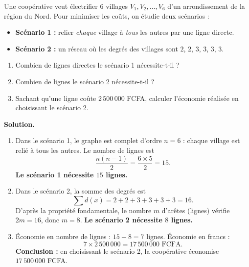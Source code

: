 \documentclass[11pt]{article}
\newcommand{\cle}[1]{{\popxbold\color{popdark}#1}}
\begin{document}
\begin{exoresolu}
Une coopérative veut électrifier $6$ villages $V_1, V_2, \dots, V_6$ d'un arrondissement de la région du Nord. Pour minimiser les coûts, on étudie deux scénarios :
\begin{itemize}
\item \textbf{Scénario 1 :} relier \emph{chaque} village à \emph{tous} les autres par une ligne directe.
\item \textbf{Scénario 2 :} un réseau où les degrés des villages sont $2$, $2$, $3$, $3$, $3$, $3$.
\end{itemize}
\begin{enumerate}
\item Combien de lignes directes le scénario 1 nécessite-t-il ?
\item Combien de lignes le scénario 2 nécessite-t-il ?
\item Sachant qu'une ligne coûte $2\,500\,000$ FCFA, calculer l'économie réalisée en choisissant le scénario 2.
\end{enumerate}
\tcblower
\textbf{Solution.}
\begin{enumerate}
\item Dans le scénario 1, le graphe est \cle{complet} d'ordre $n=6$ : chaque village est relié à tous les autres. Le nombre de lignes est
\[
\frac{n(n-1)}{2}=\frac{6\times 5}{2}=15.
\]
\textbf{Le scénario 1 nécessite $15$ lignes.}
\item Dans le scénario 2, la somme des degrés est
\[
\sum d(x)=2+2+3+3+3+3=16.
\]
D'après la propriété fondamentale, le nombre $m$ d'arêtes (lignes) vérifie $2m=16$, donc $m=8$. \textbf{Le scénario 2 nécessite $8$ lignes.}
\item Économie en nombre de lignes : $15-8=7$ lignes. Économie en francs :
\[
7 \times 2\,500\,000 = 17\,500\,000 \text{ FCFA}.
\]
\textbf{Conclusion :} en choisissant le scénario 2, la coopérative économise $17\,500\,000$ FCFA.
\end{enumerate}
\end{exoresolu}
\end{document}
